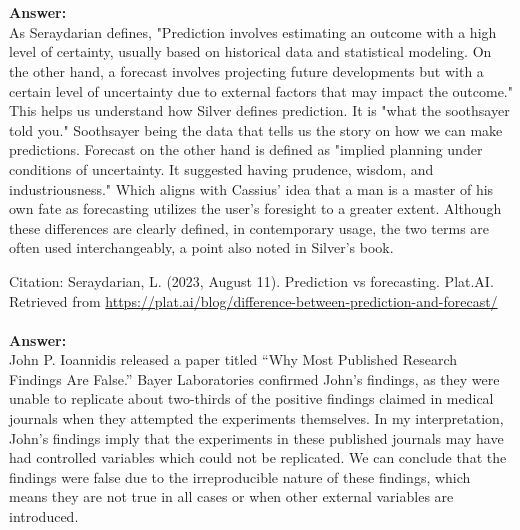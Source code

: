 \documentclass[12pt]{article}
\begin{document}

\begin{enumerate}

 \\ \\
\textbf{Answer:} \\
As Seraydarian defines, "Prediction involves estimating an outcome with a high level of certainty, usually based on historical data and statistical modeling. On the other hand, a forecast involves projecting future developments but with a certain level of uncertainty due to external factors that may impact the outcome." This helps us understand how Silver defines prediction. It is "what the soothsayer told you." Soothsayer being the data that tells us the story on how we can make predictions. Forecast on the other hand is defined as "implied planning under conditions of uncertainty. It suggested having prudence, wisdom, and industriousness." Which aligns with Cassius' idea that a man is a master of his own fate as forecasting utilizes the user's foresight to a greater extent. Although these differences are clearly defined, in contemporary usage, the two terms are often used interchangeably, a point also noted in Silver's book.

\vspace{10pt}
\noindent
Citation: Seraydarian, L. (2023, August 11). Prediction vs forecasting. Plat.AI. Retrieved from \url{https://plat.ai/blog/difference-between-prediction-and-forecast/} \\

 \\

\textbf{Answer:} \\
John P. Ioannidis released a paper titled “Why Most Published Research Findings Are False.” Bayer Laboratories confirmed John's findings, as they were unable to replicate about two-thirds of the positive findings claimed in medical journals when they attempted the experiments themselves. In my interpretation, John's findings imply that the experiments in these published journals may have had controlled variables which could not be replicated. We can conclude that the findings were false due to the irreproducible nature of these findings, which means they are not true in all cases or when other external variables are introduced. \\ 



\end{enumerate}
\end{document}
